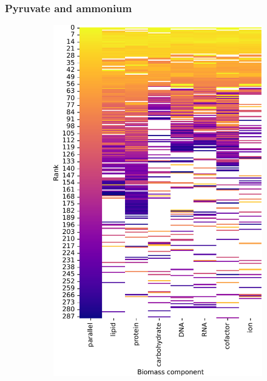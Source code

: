 \subsubsection{Pyruvate and ammonium}
\label{subsec:model-rank-pyruvate}

\begin{figure}
  \centering
  \begin{subfigure}[t]{0.45\textwidth}
  \centering
    \includegraphics[width=\linewidth]{CompareEnzUse_glc00p00_pyr03p73_amm00p90_1.pdf}
    \caption{
    }
    \label{fig:model-rank-pyr-highratio-rank}
  \end{subfigure}%

\end{figure}
